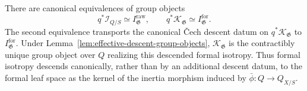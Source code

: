 \begin{theorem}
\label{thm:formal-isotropy-descent}
There are canonical equivalences of group objects
\[
    q^*\mathcal I_{Q/S}
    \simeq
    I^{\mathrm{raw}}_{\mathfrak G},
    \qquad
    q^*\mathcal K_{\mathfrak G}
    \simeq
    I^{\mathrm{for}}_{\mathfrak G}.
\]
The second equivalence transports the canonical \v{C}ech descent datum on
$q^*\mathcal K_{\mathfrak G}$ to
$I^{\mathrm{for}}_{\mathfrak G}$.  Under
Lemma~\ref{lem:effective-descent-group-objects},
$\mathcal K_{\mathfrak G}$ is the contractibly unique group object over
$Q$ realizing this descended formal isotropy.  Thus formal isotropy descends canonically, rather than by an
additional descent datum, to the formal leaf space as the kernel of the
inertia morphism induced by
$\bar\phi:Q\to Q_{X/S}$.
\end{theorem}


